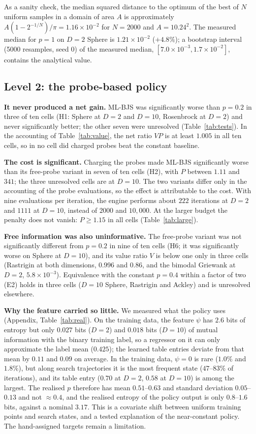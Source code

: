 \documentclass[conference]{IEEEtran}
\begin{document}
As a sanity check, the median squared distance to the optimum of the best of $N$ uniform samples in a domain of area $A$ is approximately $A(1-2^{-1/N})/\pi=1.16\times10^{-2}$ for $N=2000$ and $A=10.24^2$. The measured median for $p=1$ on $D=2$ Sphere is $1.21\times10^{-2}$ ($+4.8\%$); a bootstrap interval (5000 resamples, seed 0) of the measured median, $[7.0\times10^{-3},1.7\times10^{-2}]$, contains the analytical value.

\subsection{Level 2: the probe-based policy}
\textbf{It never produced a net gain.} ML-BJS was significantly worse than $p=0.2$ in three of ten cells (H1: Sphere at $D=2$ and $D=10$, Rosenbrock at $D=2$) and never significantly better; the other seven were unresolved (Table~\ref{tab:tests}). In the accounting of Table~\ref{tab:value}, the net ratio $VP$ is at least $1.005$ in all ten cells, so in no cell did charged probes beat the constant baseline.

\textbf{The cost is significant.} Charging the probes made ML-BJS significantly worse than its free-probe variant in seven of ten cells (H2), with $P$ between $1.11$ and $341$; the three unresolved cells are at $D=10$. The two variants differ only in the accounting of the probe evaluations, so the effect is attributable to the cost. With nine evaluations per iteration, the engine performs about $222$ iterations at $D=2$ and $1111$ at $D=10$, instead of $2000$ and $10{,}000$. At the larger budget the penalty does not vanish: $P\ge1.15$ in all cells (Table~\ref{tab:large}).

\textbf{Free information was also uninformative.} The free-probe variant was not significantly different from $p=0.2$ in nine of ten cells (H6; it was significantly worse on Sphere at $D=10$), and its value ratio $V$ is below one only in three cells (Rastrigin at both dimensions, $0.996$ and $0.86$, and the bimodal Griewank at $D=2$, $5.8\times10^{-3}$). Equivalence with the constant $p=0.4$ within a factor of two (E2) holds in three cells ($D=10$ Sphere, Rastrigin and Ackley) and is unresolved elsewhere.

\textbf{Why the feature carried so little.} We measured what the policy uses (Appendix, Table~\ref{tab:real}). On the training data, the feature $\psi$ has $2.6$ bits of entropy but only $0.027$ bits ($D=2$) and $0.018$ bits ($D=10$) of mutual information with the binary training label, so a regressor on it can only approximate the label mean ($0.425$); the learned table entries deviate from that mean by $0.11$ and $0.09$ on average. In the training data, $\psi=0$ is rare ($1.0\%$ and $1.8\%$), but along search trajectories it is the most frequent state ($47$--$83\%$ of iterations), and its table entry ($0.70$ at $D=2$, $0.58$ at $D=10$) is among the largest. The realised $p$ therefore has mean $0.51$--$0.63$ and standard deviation $0.05$--$0.13$ and not $\approx0.4$, and the realised entropy of the policy output is only $0.8$--$1.6$ bits, against a nominal $3.17$. This is a covariate shift between uniform training points and search states, and a tested explanation of the near-constant policy. The hand-assigned targets remain a limitation.
\end{document}

